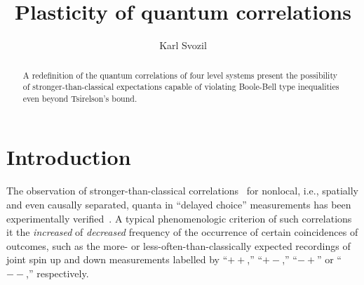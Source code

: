 \documentclass[pra,amsfonts,showpacs,showkeys,preprint]{revtex4}
\begin{document}


\title{Plasticity of quantum correlations}

\author{Karl Svozil}


\begin{abstract}
A redefinition of the quantum correlations of four level systems present the possibility of stronger-than-classical expectations capable of violating Boole-Bell type inequalities even beyond Tsirelson's bound.
\end{abstract}





\maketitle


\section{Introduction}

The observation of stronger-than-classical correlations~\cite{clauser,aspect-82a,peres222} for nonlocal, i.e., spatially and even causally separated, quanta
in  ``delayed choice'' measurements has been experimentally verified~\cite{wjswz-98}.
A typical phenomenologic criterion of such correlations it the {\em increased} of {\em decreased} frequency of the occurrence of certain coincidences of outcomes,
such as the more- or less-often-than-classically expected recordings of joint spin up and down measurements labelled by ``$++$,'' ``$+-$,'' ``$-+$'' or ``$--$,'' respectively.
\end{document}
